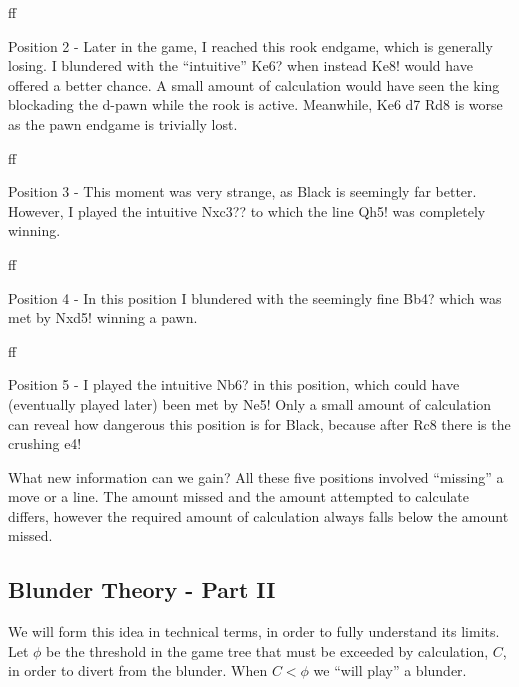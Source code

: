\documentclass{article}
\newcommand{\cb}[2][]{
  {
  \par
  \centering
  \if#1f
    {\chessboard[setfen=#2, inverse]}
  \else
    \chessboard[setfen=#2]
  \fi
  \par
  }
}
\begin{document}
\cb[f]{1r6/5k1p/3P1pp1/1Pp5/p7/P2RP2P/5PP1/5K2 b - - 0 35}
Position 2 - Later in the game, I reached this rook endgame, which is generally losing. I blundered with the  ``intuitive'' Ke6? when instead Ke8! would have offered a better chance. A small amount of calculation would have seen the king blockading the d-pawn while the rook is active. Meanwhile, Ke6 d7 Rd8 is worse as the pawn endgame is trivially lost.

\cb[f]{rn1qkb1r/5ppp/p3p3/3p4/3Nn3/2N3P1/PP3P1P/R1BQR1K1 b kq - 0 13}
Position 3 - This moment was very strange, as Black is seemingly far better. However, I played the intuitive Nxc3?? to which the line Qh5! was completely winning.

\cb[f]{r2q1rk1/pb1nbppp/1pp1pn2/3p4/2PP4/1PN2NP1/P1QBPPBP/R2R2K1 b - - 0 11}
Position 4 - In this position I blundered with the seemingly fine Bb4? which was met by Nxd5! winning a pawn.

\cb[f]{r2qk2r/p2n1ppp/2pb1n2/1p1p1bB1/3P4/1QN1PN2/PP2BPPP/2R1K2R b Kkq - 0 10}
Position 5 - I played the intuitive Nb6? in this position, which could have (eventually played later) been met by Ne5! Only a small amount of calculation can reveal how dangerous this position is for Black, because after Rc8 there is the crushing e4!

What new information can we gain? All these five positions involved ``missing'' a move or a line. The amount missed and the amount attempted to calculate differs, however the required amount of calculation always falls below the amount missed.

\subsection{Blunder Theory - Part II}
We will form this idea in technical terms, in order to fully understand its limits. Let $\phi$ be the threshold in the game tree that must be exceeded by calculation, $C$, in order to divert from the blunder. When $C<\phi$ we ``will play'' a blunder.
\end{document}
